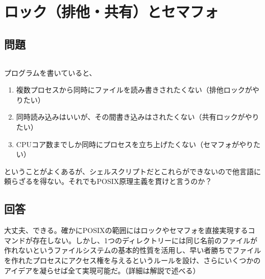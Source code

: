 \section{ロック（排他・共有）とセマフォ}
\label{recipe:lock}

\subsection*{問題}
\noindent
$\!\!\!\!\!$
\begin{grshfboxit}{160.0mm}
	プログラムを書いていると、
	\begin{enumerate}
	  \item 複数プロセスから同時にファイルを読み書きされたくない（排他ロックがやりたい）
	  \item 同時読み込みはいいが、その間書き込みはされたくない（共有ロックがやりたい）
	  \item CPUコア数までしか同時にプロセスを立ち上げたくない（セマフォがやりたい）
	\end{enumerate}
	ということがよくあるが、シェルスクリプトだとこれらができないので他言語に頼らざるを得ない。それでもPOSIX原理主義を貫けと言うのか？
\end{grshfboxit}

\subsection*{回答}
大丈夫、できる。確かにPOSIXの範囲にはロックやセマフォを直接実現するコマンドが存在しない。しかし、1つのディレクトリーには同じ名前のファイルが作れないというファイルシステムの基本的性質を活用し、早い者勝ちでファイルを作れたプロセスにアクセス権を与えるというルールを設け、さらにいくつかのアイデアを凝らせば全て実現可能だ。（詳細は解説で述べる）

